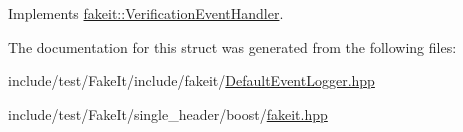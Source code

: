 Implements \mbox{\hyperlink{structfakeit_1_1VerificationEventHandler_a826b9d15e23bad7013b219d8e45ef1d0}{fakeit\+::\+Verification\+Event\+Handler}}.



The documentation for this struct was generated from the following files\+:\begin{DoxyCompactItemize}
\item 
include/test/\+Fake\+It/include/fakeit/\mbox{\hyperlink{DefaultEventLogger_8hpp}{Default\+Event\+Logger.\+hpp}}\item 
include/test/\+Fake\+It/single\+\_\+header/boost/\mbox{\hyperlink{single__header_2boost_2fakeit_8hpp}{fakeit.\+hpp}}\end{DoxyCompactItemize}
